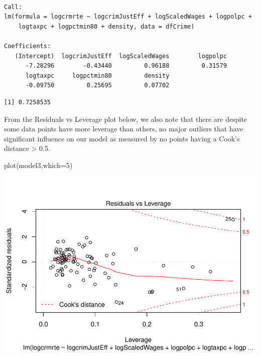 \documentclass[]{article}
\newenvironment{Shaded}{}{}
\newcommand{\DataTypeTok}[1]{#1}
\newcommand{\DecValTok}[1]{#1}
\newcommand{\KeywordTok}[1]{\textcolor[rgb]{0.00,0.00,1.00}{#1}}
\newcommand{\NormalTok}[1]{#1}
\newcommand{\OperatorTok}[1]{#1}
\begin{document}
\begin{verbatim}

Call:
lm(formula = logcrmrte ~ logcrimJustEff + logScaledWages + logpolpc + 
    logtaxpc + logpctmin80 + density, data = dfCrime)

Coefficients:
   (Intercept)  logcrimJustEff  logScaledWages        logpolpc  
      -7.28296        -0.43440         0.96188         0.31579  
      logtaxpc     logpctmin80         density  
      -0.09750         0.25695         0.07702  
\end{verbatim}

\begin{Shaded}
\end{Shaded}

\begin{verbatim}
[1] 0.7258535
\end{verbatim}

From the Residuals vs Leverage plot below, we also note that there are
despite some data points have more leverage than others, no major
outliers that have significant influence on our model as measured by no
points having a Cook's distance \textgreater{} 0.5.

\begin{Shaded}
\begin{Highlighting}[]
\KeywordTok{plot}\NormalTok{(model3,}\DataTypeTok{which=}\DecValTok{5}\NormalTok{)}
\end{Highlighting}
\end{Shaded}

\includegraphics{Bagnard_Gaustad_Hartman_Leung_Lab_3_files/figure-latex/unnamed-chunk-84-1.pdf}
\end{document}
